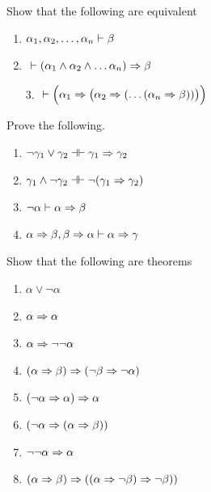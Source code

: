 \begin{exercise}
Show that the following are equivalent
\begin{multicols}{2}
\begin{enumerate}
\item $\alpha_1, \alpha_2, \dots, \alpha_n \vdash \beta$
\item \true $~\vdash (\alpha_1 \wedge \alpha_2 \wedge \dots \alpha_n) \Rightarrow \beta$
\end{enumerate}
\end{multicols}
\begin{enumerate}
\item [3.] \true $~\vdash \Big(\alpha_1 \Rightarrow \big(\alpha_2 \Rightarrow (\dots (\alpha_n \Rightarrow \beta))\big)\Big)$
\end{enumerate}
\label{exercise:natequiv}
\end{exercise}

\begin{exercise}
Prove the following.
\begin{multicols}{2}
\begin{enumerate}
\item $\neg \gamma_1 \vee \gamma_2  \dashv \vdash \gamma_1 \Rightarrow \gamma_2$ 
\item $\gamma_1 \wedge \neg \gamma_2  \dashv \vdash \neg (\gamma_1 \Rightarrow \gamma_2)$	 
\item $\neg \alpha \vdash \alpha \Rightarrow \beta$
\item $\alpha \Rightarrow \beta, \beta \Rightarrow \alpha \vdash \alpha \Rightarrow \gamma$
\end{enumerate}
\end{multicols}
\label{exercise:toimpl}
\end{exercise}

\begin{exercise}
Show that the following are theorems
\begin{multicols}{2}
\begin{enumerate}
\item $\alpha \vee \neg \alpha$
\item $\alpha \Rightarrow \alpha$
\item $\alpha \Rightarrow \neg \neg \alpha$
\item $(\alpha \Rightarrow \beta) \Rightarrow (\neg \beta \Rightarrow \neg \alpha)$
\item $(\neg \alpha \Rightarrow \alpha) \Rightarrow \alpha$
\item $ (\neg \alpha \Rightarrow (\alpha \Rightarrow \beta))$
\item $ \neg \neg \alpha \Rightarrow \alpha$
\item $(\alpha \Rightarrow \beta) \Rightarrow ((\alpha \Rightarrow \neg \beta) \Rightarrow \neg \beta))$
\end{enumerate}
\end{multicols}
\end{exercise}



